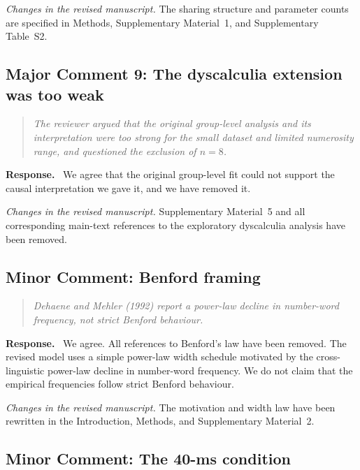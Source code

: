 \documentclass[11pt]{article}
\newenvironment{reviewercomment}{\begin{quote}\color{reviewgray}\itshape}{\end{quote}}
\newenvironment{authorresponse}{\par\noindent\textbf{\color{responseblue}Response.}\ }{\par}
\newcommand{\change}[1]{\par\noindent\textit{Changes in the revised manuscript.} #1\par}
\begin{document}
\change{The sharing structure and parameter counts are specified in Methods, Supplementary Material~1, and Supplementary Table~S2.}

\subsection*{Major Comment 9: The dyscalculia extension was too weak}

\begin{reviewercomment}
The reviewer argued that the original group-level analysis and its interpretation were too strong for the small dataset and limited numerosity range, and questioned the exclusion of $n=8$.
\end{reviewercomment}

\begin{authorresponse}
We agree that the original group-level fit could not support the causal interpretation we gave it, and we have removed it.
\end{authorresponse}

\change{Supplementary Material~5 and all corresponding main-text references to the exploratory dyscalculia analysis have been removed.}

\subsection*{Minor Comment: Benford framing}

\begin{reviewercomment}
Dehaene and Mehler (1992) report a power-law decline in number-word frequency, not strict Benford behaviour.
\end{reviewercomment}

\begin{authorresponse}
We agree. All references to Benford's law have been removed. The revised model uses a simple power-law width schedule motivated by the cross-linguistic power-law decline in number-word frequency. We do not claim that the empirical frequencies follow strict Benford behaviour.
\end{authorresponse}

\change{The motivation and width law have been rewritten in the Introduction, Methods, and Supplementary Material~2.}

\subsection*{Minor Comment: The 40-ms condition}
\end{document}
